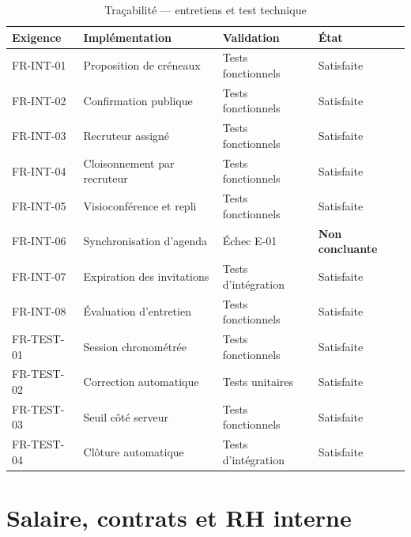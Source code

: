 \begin{table}[htbp]
  \centering
  \caption{Traçabilité — entretiens et test technique}
  \begin{tabularx}{\textwidth}{L{2.3cm} L{3.4cm} L{3.0cm} X}
    \toprule
    \textbf{Exigence} & \textbf{Implémentation} & \textbf{Validation} & \textbf{État} \\
    \midrule
    FR-INT-01  & Proposition de créneaux & Tests fonctionnels & Satisfaite \\
    FR-INT-02  & Confirmation publique & Tests fonctionnels & Satisfaite \\
    FR-INT-03  & Recruteur assigné & Tests fonctionnels & Satisfaite \\
    FR-INT-04  & Cloisonnement par recruteur & Tests fonctionnels & Satisfaite \\
    FR-INT-05  & Visioconférence et repli & Tests fonctionnels & Satisfaite \\
    FR-INT-06  & Synchronisation d'agenda & Échec E-01 & \textbf{Non concluante} \\
    FR-INT-07  & Expiration des invitations & Tests d'intégration & Satisfaite \\
    FR-INT-08  & Évaluation d'entretien & Tests fonctionnels & Satisfaite \\
    FR-TEST-01 & Session chronométrée & Tests fonctionnels & Satisfaite \\
    FR-TEST-02 & Correction automatique & Tests unitaires & Satisfaite \\
    FR-TEST-03 & Seuil côté serveur & Tests fonctionnels & Satisfaite \\
    FR-TEST-04 & Clôture automatique & Tests d'intégration & Satisfaite \\
    \bottomrule
  \end{tabularx}
\end{table}

\section{Salaire, contrats et RH interne}

